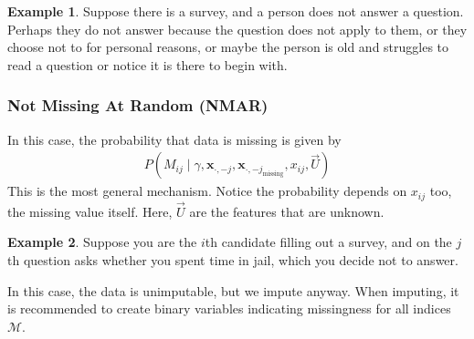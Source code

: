 \documentclass[12pt, a4paper]{article}
\theoremstyle{definition}
\newtheorem*{example}{Example}
\begin{document}
	\begin{tcolorbox}[breakable]
		\begin{example}
			Suppose there is a survey, and a person does not answer a question.
			Perhaps they do not answer because the question does not apply to them, or
			they choose not to for personal reasons, or maybe the person is old and struggles
			to read a question or notice it is there to begin with.
		\end{example}
	\end{tcolorbox}
	\subsubsection{Not Missing At Random (NMAR)}
	In this case, the probability that data is missing is given by
	\begin{align*}
		P\left(
		M_{ij} \mid \gamma, \bm{x}_{\cdot, -j}, \bm{x}_{\cdot, -j_{\text{missing}}},x_{ij}, \vec{U}
		\right)
	\end{align*}
	This is the most general mechanism. Notice the probability depends on $x_{ij}$ too,
	the missing value itself. Here, $\vec{U}$ are the features that are unknown.
	\begin{tcolorbox}[breakable]
		\begin{example}
			Suppose you are the $i$th candidate filling out a survey, and on the
			$j$th question asks whether you spent time in jail, which you decide
			not to answer.
		\end{example}
	\end{tcolorbox}
	In this case, the data is unimputable, but we impute anyway. When imputing,
	it is recommended to create binary variables indicating missingness for all
	indices $\mathcal{M}$.
	
\end{document}
